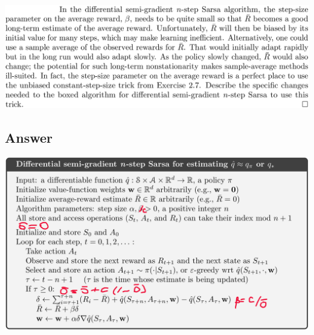 \documentclass[11pt]{article}
\begin{document}
    \includegraphics[scale=0.9]{exercise_10_9q}

    \subsection*{Answer}

    \includegraphics[scale=0.8]{exercise_10_9}
\end{document}
